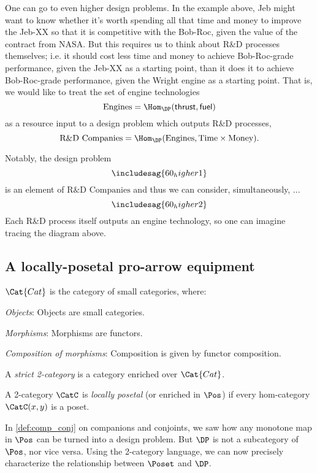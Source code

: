 One can go to even higher design problems. In the example above, Jeb might want to know whether it's worth spending all that time and money to improve the Jeb-XX so that it is competitive with the Bob-Roc, given the value of the contract from NASA. But this requires us to think about R\&D processes themselves; i.e. it should cost less time and money to achieve Bob-Roc-grade performance, given the Jeb-XX as a starting point, than it does it to achieve Bob-Roc-grade performance, given the Wright engine as a starting point. That is, we would like to treat the set of engine technologies
\[\text{Engines} = \Hom_\DP(\mathsf{thrust}, \mathsf{fuel})\]
as a resource input to a design problem which outputs R\&D processes,
\[\text{R\&D Companies} = \Hom_\DP(\text{Engines}, \text{Time} \times \text{Money}).\]

Notably, the design problem
\[
\includesag{60_higher1}
\]
is an element of $\text{R\&D Companies}$ and thus we can consider, simultaneously, ...
\[
\includesag{60_higher2}
\]
Each R\&D process itself outputs an engine technology, so one can imagine tracing the diagram above.

\subsection{A locally-posetal pro-arrow equipment}
\begin{definition}
$\Cat{Cat}$ is the category of small categories, where:
\begin{compactenum}
    \item \emph{Objects}: Objects are small categories.
    \item \emph{Morphisms}: Morphisms are functors.
    \item \emph{Composition of morphisms}: Composition is given by functor composition.
\end{compactenum}
\end{definition}

\begin{definition}[2-category]
A \emph{strict 2-category} is a category enriched over $\Cat{Cat}$.
\end{definition}

\begin{definition}
\label{def:locallyposetalcat}
A 2-category $\CatC$ is \emph{locally posetal} (or enriched in $\Pos$) if every hom-category $\CatC(x,y)$ is a poset.
\end{definition}
In \cref{def:comp_conj} on companions and conjoints, we saw how any monotone map in $\Pos$ can be turned into a design problem. But $\DP$ is not a subcategory of $\Pos$, nor vice versa. Using the 2-category language, we can now precisely characterize the relationship between $\Poset$ and $\DP$. %

